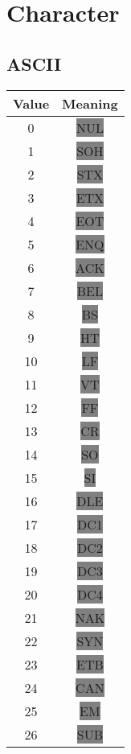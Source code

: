 \documentclass[12pt]{book}
\begin{document}
  \section{Character}

  \newpage
  \subsection{ASCII}

  {\ttfamily\begin{tabular}{c c}
    \hline
    Value & Meaning \\
    \hline
      0 & \colorbox{gray}{NUL} \\
      1 & \colorbox{gray}{SOH} \\
      2 & \colorbox{gray}{STX} \\
      3 & \colorbox{gray}{ETX} \\
      4 & \colorbox{gray}{EOT} \\
      5 & \colorbox{gray}{ENQ} \\
      6 & \colorbox{gray}{ACK} \\
      7 & \colorbox{gray}{BEL} \\
      8 & \colorbox{gray}{BS} \\
      9 & \colorbox{gray}{HT} \\
     10 & \colorbox{gray}{LF} \\
     11 & \colorbox{gray}{VT} \\
     12 & \colorbox{gray}{FF} \\
     13 & \colorbox{gray}{CR} \\
     14 & \colorbox{gray}{SO} \\
     15 & \colorbox{gray}{SI} \\
     16 & \colorbox{gray}{DLE} \\
     17 & \colorbox{gray}{DC1} \\
     18 & \colorbox{gray}{DC2} \\
     19 & \colorbox{gray}{DC3} \\
     20 & \colorbox{gray}{DC4} \\
     21 & \colorbox{gray}{NAK} \\
     22 & \colorbox{gray}{SYN} \\
     23 & \colorbox{gray}{ETB} \\
     24 & \colorbox{gray}{CAN} \\
     25 & \colorbox{gray}{EM} \\
     26 & \colorbox{gray}{SUB} \\

\end{tabular}}
\end{document}
